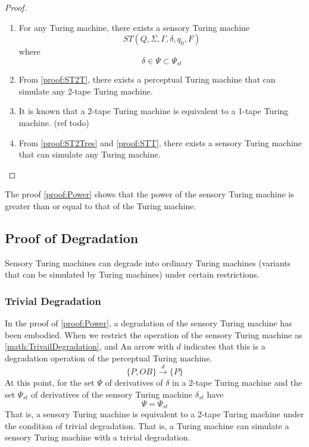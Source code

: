 \begin{proof}
\begin{enumerate}
    \item \label{proof:ST2T}For any Turing machine, there exists a sensory Turing machine
    \begin{equation}
        ST(Q,\Sigma,\Gamma,\delta,q_0,F)
    \end{equation}
    where
    \begin{equation}
        \delta \in \Psi \subset \Psi_{st}
    \end{equation}
    \item \label{proof:ST2Tres}From \ref{proof:ST2T}, there exists a perceptual Turing machine that can simulate any 2-tape Turing machine.
    \item \label{proof:STT}It is known that a 2-tape Turing machine is equivalent to a 1-tape Turing machine. (ref todo)
    \item From \ref{proof:ST2Tres} and \ref{proof:STT}, there exists a sensory Turing machine that can simulate any Turing machine.
\end{enumerate}
\end{proof}
The proof \ref{proof:Power} shows that the power of the sensory Turing machine is greater than or equal to that of the Turing machine.


\subsection{Proof of Degradation}
Sensory Turing machines can degrade into ordinary Turing machines (variants that can be simulated by Turing machines) under certain restrictions.
\subsubsection{Trivial Degradation} \label{proof:Trivail}
In the proof of \ref{proof:Power}, a degradation of the sensory Turing machine has been embodied. When we restrict the operation of the sensory Turing machine as \ref{math:TrivailDegradation}, and An arrow with $d$ indicates that this is a degradation operation of the perceptual Turing machine.
\begin{equation}\label{math:TrivailDegradation}
    \{P, OB\} \stackrel{d}{\to} \{P\}
\end{equation}
At this point, for the set $\Psi$ of derivatives of $\delta$ in a 2-tape Turing machine and the set $\Psi_{st}$ of derivatives of the sensory Turing machine $\delta_{st}$ have
\begin{equation}
    \Psi = \Psi_{st}
\end{equation}
That is, a sensory Turing machine is equivalent to a 2-tape Turing machine under the condition of trivial degradation. That is, a Turing machine can simulate a sensory Turing machine with a trivial degradation.

